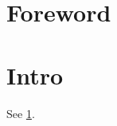 \documentclass[twocolumn,unicode]{wrapper}
\begin{document}
\wrapperclass\articleclass\layoutmode\hypermode
\tableofcontents
\section*{Foreword}
{}
\section{Intro}\label{sec:intro}
See \ref{sec:intro}.
\end{document}
